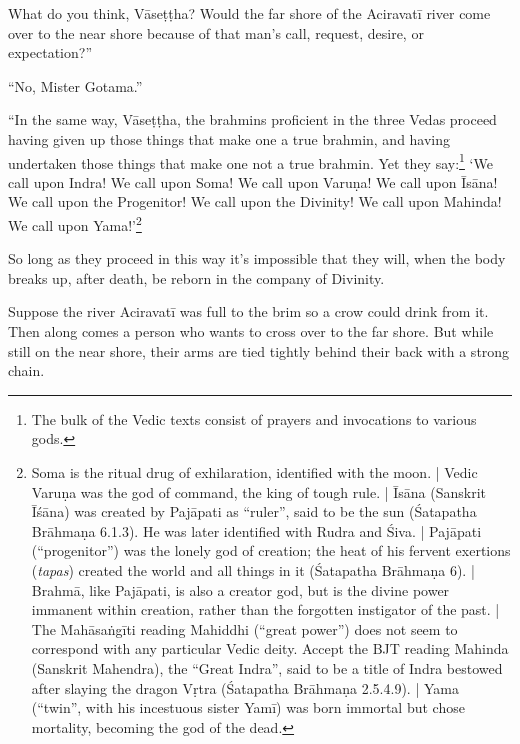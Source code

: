\documentclass[12pt,openany]{book}%
\begin{document}
What do you think, \textsanskrit{Vāseṭṭha}? Would the far shore of the \textsanskrit{Aciravatī} river come over to the near shore because of that man’s call, request, desire, or expectation?” 

“No, Mister Gotama.” 

“In the same way, \textsanskrit{Vāseṭṭha}, the brahmins proficient in the three Vedas proceed having given up those things that make one a true brahmin, and having undertaken those things that make one not a true brahmin. Yet they say:\footnote{The bulk of the Vedic texts consist of prayers and invocations to various gods. } ‘We call upon Indra! We call upon Soma! We call upon \textsanskrit{Varuṇa}! We call upon \textsanskrit{Īsāna}! We call upon the Progenitor! We call upon the Divinity! We call upon Mahinda! We call upon Yama!’\footnote{Soma is the ritual drug of exhilaration, identified with the moon. | Vedic \textsanskrit{Varuṇa} was the god of command, the king of tough rule. | \textsanskrit{Īsāna} (Sanskrit \textsanskrit{Īśāna}) was created by \textsanskrit{Pajāpati} as “ruler”, said to be the sun (Śatapatha \textsanskrit{Brāhmaṇa} 6.1.3). He was later identified with Rudra and Śiva. | \textsanskrit{Pajāpati} (“progenitor”) was the lonely god of creation; the heat of his fervent exertions (\textit{tapas}) created the world and all things in it (Śatapatha \textsanskrit{Brāhmaṇa} 6). | \textsanskrit{Brahmā}, like \textsanskrit{Pajāpati}, is also a creator god, but is the divine power immanent within creation, rather than the forgotten instigator of the past. | The \textsanskrit{Mahāsaṅgīti} reading Mahiddhi (“great power”) does not seem to correspond with any particular Vedic deity. Accept the BJT reading Mahinda (Sanskrit Mahendra), the “Great Indra”, said to be a title of Indra bestowed after slaying the dragon \textsanskrit{Vṛtra} (Śatapatha \textsanskrit{Brāhmaṇa} 2.5.4.9). | Yama (“twin”, with his incestuous sister \textsanskrit{Yamī}) was born immortal but chose mortality, becoming the god of the dead. } 

So long as they proceed in this way it’s impossible that they will, when the body breaks up, after death, be reborn in the company of Divinity. 

Suppose the river \textsanskrit{Aciravatī} was full to the brim so a crow could drink from it. Then along comes a person who wants to cross over to the far shore. But while still on the near shore, their arms are tied tightly behind their back with a strong chain. 
\end{document}
